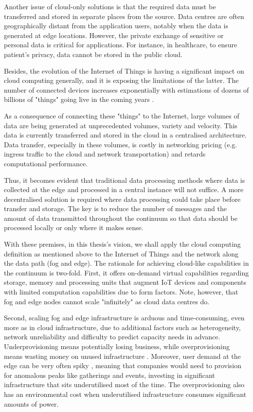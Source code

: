 Another issue of cloud-only solutions is that the required data must be transferred and stored in separate places from the source. Data centres are often geographically distant from the application users, notably when the data is generated at edge locations. However, the private exchange of sensitive or personal data is critical for applications. For instance, in healthcare, to ensure patient's privacy, data cannot be stored in the public cloud.

Besides, the evolution of the Internet of Things is having a significant impact on cloud computing generally, and it is exposing the limitations of the latter. The number of connected devices increases exponentially with estimations of dozens of billions of "things" going live in the coming years \cite{gartner-iot}.

As a consequence of connecting these "things" to the Internet, large volumes of data are being generated at unprecedented volumes, variety and velocity. This data is currently transferred and stored in the cloud in a centralised architecture. Data transfer, especially in these volumes, is costly in networking pricing (e.g. ingress traffic to the cloud and network transportation) and retards computational performance.

Thus, it becomes evident that traditional data processing methods where data is collected at the edge and processed in a central instance will not suffice. A more decentralised solution is required where data processing could take place before transfer and storage. The key is to reduce the number of messages and the amount of data transmitted throughout the continuum so that data should be processed locally or only where it makes sense.

With these premises, in this thesis's vision, we shall apply the cloud computing definition as mentioned above to the Internet of Things and the network along the data path (fog and edge). The rationale for achieving cloud-like capabilities in the continuum is two-fold. First, it offers on-demand virtual capabilities regarding storage, memory and processing units that augment IoT devices and components with limited computation capabilities due to form factors. Note, however, that fog and edge nodes cannot scale "infinitely" as cloud data centres do.

Second, scaling fog and edge infrastructure is arduous and time-consuming, even more as in cloud infrastructure, due to additional factors such as heterogeneity, network unreliability and difficulty to predict capacity needs in advance. Underprovisioning means potentially losing business, while overprovisioning means wasting money on unused infrastructure \cite{akamai}.  Moreover, user demand at the edge can be very often spiky \cite{akamai}, meaning that companies would need to provision for anomalous peaks like gatherings and events, investing in significant infrastructure that sits underutilised most of the time. The overprovisioning also has an environmental cost when underutilised infrastructure consumes significant amounts of power.

